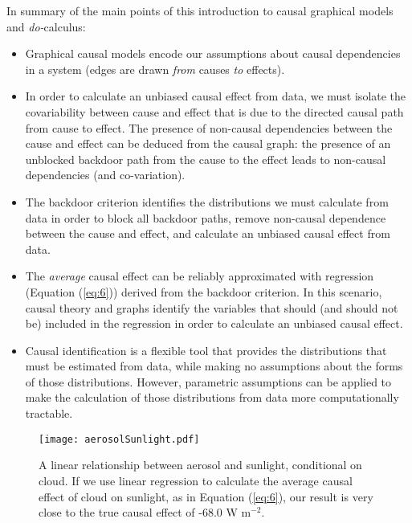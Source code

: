\documentclass[12pt]{article}
\begin{document}
In summary of the main points of this introduction to causal graphical
models and \textit{do-}calculus:

\begin{itemize}
\item Graphical causal models encode our assumptions about causal
  dependencies in a system (edges are drawn \emph{from} causes
  \emph{to} effects).
\item In order to calculate an unbiased causal effect from data, we
  must isolate the covariability between cause and effect that is due
  to the directed causal path from cause to effect. The presence of
  non-causal dependencies between the cause and effect can be deduced
  from the causal graph: the presence of an unblocked backdoor path
  from the cause to the effect leads to non-causal dependencies (and
  co-variation).
\item The backdoor criterion identifies the distributions we must
  calculate from data in order to block all backdoor paths, remove
  non-causal dependence between the cause and effect, and calculate an
  unbiased causal effect from data.
\item The \emph{average} causal effect can be reliably approximated
  with regression (Equation (\ref{eq:6})) derived from the backdoor
  criterion. In this scenario, causal theory and graphs identify the
  variables that should (and should not be) included in the regression
  in order to calculate an unbiased causal effect.
\item Causal identification is a flexible tool that provides the
  distributions that must be estimated from data, while making no
  assumptions about the forms of those distributions. However,
  parametric assumptions can be applied to make the calculation of
  those distributions from data more computationally tractable.
\end{itemize}

\begin{figure}
  \texttt{[image: aerosolSunlight.pdf]}
  \caption{A linear relationship between aerosol and sunlight,
    conditional on cloud. If we use linear regression to calculate the
    average causal effect of cloud on sunlight, as in Equation
    (\ref{eq:6}), our result is very close to the true causal effect
    of -68.0 W m$^{-2}$.}
  \label{fig:linear}
\end{figure}
\end{document}

